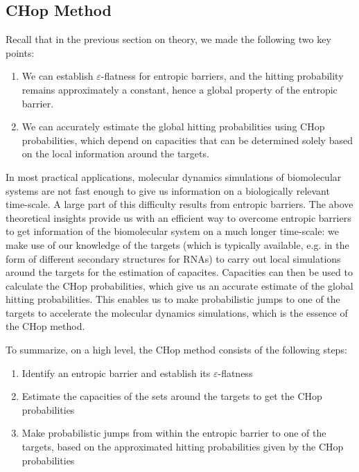 \documentclass[english, aip, jcp, priprint, graphicx]{revtex4-1}
\theoremstyle{plain}
\theoremstyle{definition}
\theoremstyle{plain}
\begin{document}
\subsection{CHop Method}

Recall that in the previous section on theory, we made the following two key points:

\begin{enumerate}
	\item We can establish $\varepsilon$-flatness for entropic barriers, and the hitting probability remains approximately a constant, hence a global property of the entropic barrier.
	\item We can accurately estimate the global hitting probabilities using CHop probabilities, which depend on capacities that can be determined solely based on the local information around the targets.
\end{enumerate}

In most practical applications, molecular dynamics simulations of biomolecular systems are not fast enough to give us information on a biologically relevant time-scale. A large part of this difficulty results from entropic barriers\cite{Teschner1987-qs, Jacob1999-bs, Goldberg1999-mv, Plaxco1998-iv, McLeish2005-dq}. The above theoretical insights provide us with an efficient way to overcome entropic barriers to get information of the biomolecular system on a much longer time-scale: we make use of our knowledge of the targets (which is typically available, e.g. in the form of different secondary structures for RNAs) to carry out local simulations around the targets for the estimation of capacites. Capacities can then be used to calculate the CHop probabilities, which give us an accurate estimate of the global hitting probabilities. This enables us to make probabilistic jumps to one of the targets to accelerate the molecular dynamics simulations, which is the essence of the CHop method.

To summarize, on a high level, the CHop method consists of the following steps: 

\begin{enumerate}
	\item Identify an entropic barrier and establish its $\varepsilon$-flatness
	\item Estimate the capacities of the sets around the targets to get the CHop probabilities
	\item Make probabilistic jumps from within the entropic barrier to one of the targets, based on the approximated hitting probabilities given by the CHop probabilities
\end{enumerate}
\end{document}
